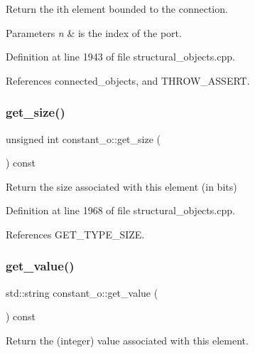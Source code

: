 Return the ith element bounded to the connection. 


\begin{DoxyParams}{Parameters}
{\em n} & is the index of the port. \\
\hline
\end{DoxyParams}


Definition at line 1943 of file structural\+\_\+objects.\+cpp.



References connected\+\_\+objects, and T\+H\+R\+O\+W\+\_\+\+A\+S\+S\+E\+RT.

\mbox{\label{classconstant__o_a98f744693152c30b90c614306edaa732}} 
\subsubsection{\texorpdfstring{get\+\_\+size()}{get\_size()}}
{\footnotesize\ttfamily unsigned int constant\+\_\+o\+::get\+\_\+size (\begin{DoxyParamCaption}{ }\end{DoxyParamCaption}) const}



Return the size associated with this element (in bits) 



Definition at line 1968 of file structural\+\_\+objects.\+cpp.



References G\+E\+T\+\_\+\+T\+Y\+P\+E\+\_\+\+S\+I\+ZE.

\mbox{\label{classconstant__o_afd5134cbc13e0d2bf8583322d90478ac}} 
\subsubsection{\texorpdfstring{get\+\_\+value()}{get\_value()}}
{\footnotesize\ttfamily std\+::string constant\+\_\+o\+::get\+\_\+value (\begin{DoxyParamCaption}{ }\end{DoxyParamCaption}) const}



Return the (integer) value associated with this element. 



